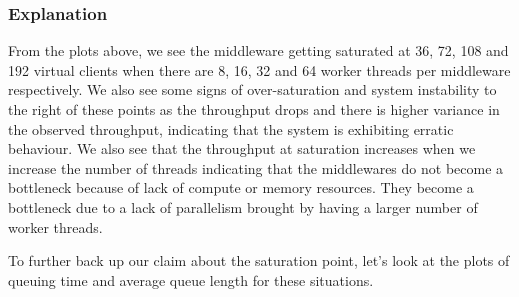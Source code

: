 \documentclass[11pt,a4paper]{article}
\newcommand\instructions[1]{\textcolor{blue}{Instructions: #1}}
\begin{document}
\subsubsection{Explanation}


From the plots above, we see the middleware getting saturated at 36, 72, 108 and 192 virtual clients when there are 8, 16, 32 and 64 worker threads per middleware respectively. We also see some signs of over-saturation and system instability to the right of these points as the throughput drops and there is higher variance in the observed throughput, indicating that the system is exhibiting erratic behaviour. We also see that the throughput at saturation increases when we increase the number of threads indicating that the middlewares do not become a bottleneck because of lack of compute or memory resources. They become a bottleneck due to a lack of parallelism brought by having a larger number of worker threads. 

To further back up our claim about the saturation point, let's look at the plots of queuing time and average queue length for these situations.
\end{document}
